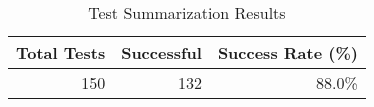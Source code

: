 \begin{table}[htbp]
\centering
\caption{Test Summarization Results}
\label{tab:step3_opcode_summary}
\begin{tabular}{rrr}
\toprule
Total Tests & Successful & Success Rate (\%) \\
\midrule
150 & 132 & 88.0\% \\
\bottomrule
\end{tabular}
\end{table}